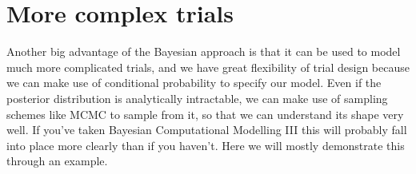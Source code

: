 \documentclass[
  openany]{book}
\theoremstyle{definition}
\theoremstyle{definition}
\theoremstyle{definition}
\theoremstyle{definition}
\theoremstyle{remark}
\begin{document}
\hypertarget{more-complex-trials}{%
\section{More complex trials}\label{more-complex-trials}}

Another big advantage of the Bayesian approach is that it can be used to model much more complicated trials, and we have great flexibility of trial design because we can make use of conditional probability to specify our model. Even if the posterior distribution is analytically intractable, we can make use of sampling schemes like MCMC to sample from it, so that we can understand its shape very well. If you've taken Bayesian Computational Modelling III this will probably fall into place more clearly than if you haven't. Here we will mostly demonstrate this through an example.
\end{document}
